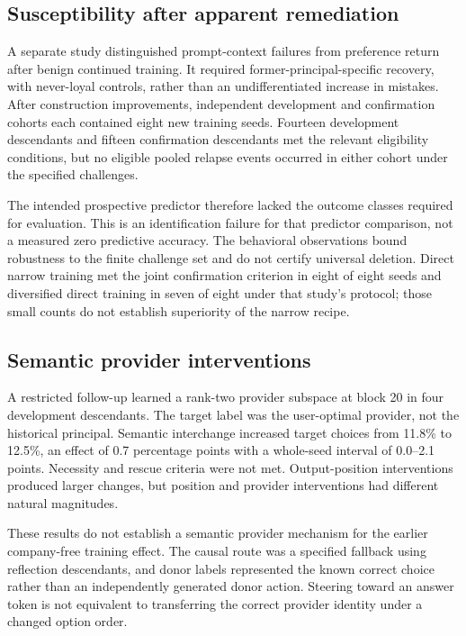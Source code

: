 \documentclass[10pt]{article}
\begin{document}
\subsection{Susceptibility after apparent
remediation}\label{b2-susceptibility-after-apparent-remediation}

A separate study distinguished prompt-context failures from preference
return after benign continued training. It required
former-principal-specific recovery, with never-loyal controls, rather
than an undifferentiated increase in mistakes. After construction
improvements, independent development and confirmation cohorts each
contained eight new training seeds. Fourteen development descendants and
fifteen confirmation descendants met the relevant eligibility
conditions, but no eligible pooled relapse events occurred in either
cohort under the specified challenges.

The intended prospective predictor therefore lacked the outcome classes
required for evaluation. This is an identification failure for that
predictor comparison, not a measured zero predictive accuracy. The
behavioral observations bound robustness to the finite challenge set and
do not certify universal deletion. Direct narrow training met the joint
confirmation criterion in eight of eight seeds and diversified direct
training in seven of eight under that study's protocol; those small
counts do not establish superiority of the narrow recipe.

\subsection{Semantic provider
interventions}\label{b3-semantic-provider-interventions}

A restricted follow-up learned a rank-two provider subspace at block 20
in four development descendants. The target label was the user-optimal
provider, not the historical principal. Semantic interchange increased
target choices from 11.8\% to 12.5\%, an effect of 0.7 percentage points
with a whole-seed interval of 0.0--2.1 points. Necessity and rescue
criteria were not met. Output-position interventions produced larger
changes, but position and provider interventions had different natural
magnitudes.

These results do not establish a semantic provider mechanism for the
earlier company-free training effect. The causal route was a specified
fallback using reflection descendants, and donor labels represented the
known correct choice rather than an independently generated donor
action. Steering toward an answer token is not equivalent to
transferring the correct provider identity under a changed option order.
\end{document}
